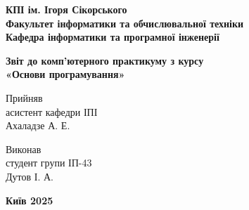\begin{titlepage}
	\begin{center}
		{\fontsize{14pt}{16pt}\selectfont\textbf{КПІ ім. Ігоря Сікорського} \\
			\textbf{Факультет інформатики та обчислювальної техніки} \\
			\textbf{Кафедра інформатики та програмної інженерії}}\\
	\end{center}

	\vspace{1cm}

	\begin{center}
		{\fontsize{14}{16pt}\selectfont\textbf{Звіт до комп'ютерного практикуму з курсу}\\
			\textbf{«Основи програмування»}\\}
	\end{center}

	\vspace{6cm}

	\singlespacing
	\begin{multicols}{3}
		{
			\raggedright
			\fontsize{12pt}{12pt} \selectfont
			Прийняв \\
			асистент кафедри ІПІ \\
			Ахаладзе А. Е. \\
			\labdate
		}

		\columnbreak
		\vfill\null
		\columnbreak

		{
			\raggedright
			\fontsize{12pt}{14pt} \selectfont
			Виконав \\
			студент групи ІП-43 \\
			Дутов І. А. \\
		}
	\end{multicols}

	\vfill
	\begin{center}
		{\fontsize{14}{16}\selectfont\textbf{Київ 2025}}
	\end{center}
\end{titlepage}
\newpage

